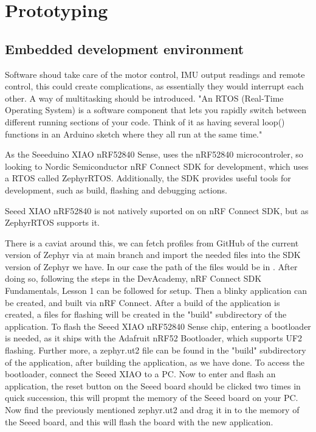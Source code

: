 \documentclass[a4paper,11pt]{article}
\begin{document}
\section{Prototyping}
\subsection{Embedded development environment}

Software shoud take care of the motor control, IMU output readings and remote control, this could create complications, as essentially they would interrupt each other. A way of multitasking should be introduced. 
"An RTOS (Real-Time Operating System) is a software component that lets you rapidly switch between different running sections of your code. Think of it as having several loop() functions in an Arduino sketch where they all run at the same time." \cite{Joe2019}

As the Seeeduino XIAO nRF52840 Sense, uses the nRF52840 microcontroler, so looking to Nordic Semiconductor nRF Connect SDK for development, which uses a RTOS called ZephyrRTOS.
Additionally, the SDK provides useful tools for development, such as build, flashing and debugging actions. \cite{nRF}


Seeed XIAO nRF52840 is not natively suported on on nRF Connect SDK, but as ZephyrRTOS supports it. \cite{docsZephyr}

There is a caviat around this, we can fetch profiles from GitHub of the current version of Zephyr via  at main branch \cite{gitZephyr} and import the needed files into the SDK version of Zephyr we have.
In our case the path of the files would be in  .
After doing so, following the steps in the DevAcademy, nRF Connect SDK Fundamentals, Lesson 1 can be followed for setup. Then a blinky application can be created, and built via nRF Connect.
After a build of the application is created, a files for flashing will be created in the "build" subdirectory of the application.
To flash the Seeed XIAO nRF52840 Sense chip, entering a bootloader is needed, as it ships with the Adafruit nRF52 Bootloader, which supports UF2 flashing. \cite{docsZephyr}
Further more, a zephyr.ut2 file can be found in the "build" subdirectory of the application, after building the application, as we have done.
To access the bootloader, connect the Seeed XIAO to a PC.
Now to enter and flash an application, the reset button on the Seeed board should be clicked two times in quick succession, this will propmt the memory of the Seeed board on your PC.
Now find the previously mentioned zephyr.ut2 and drag it in to the memory of the Seeed board, and this will flash the board with the new application.
\end{document}

